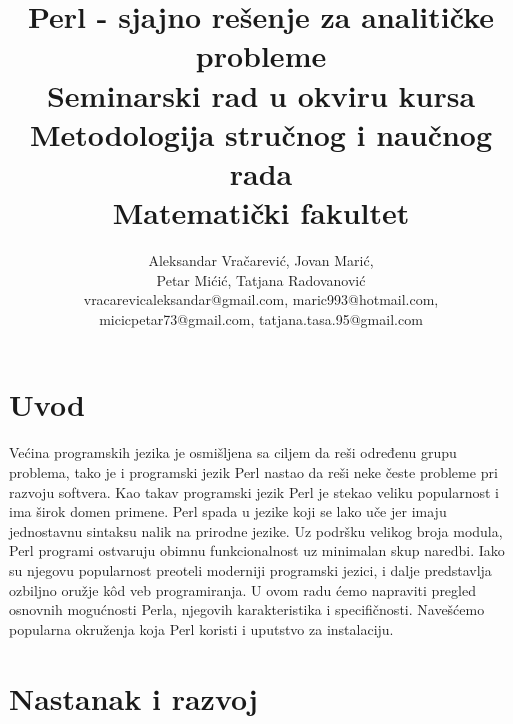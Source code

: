 \documentclass[a4paper]{article}
\begin{document}
\title{Perl - sjajno re\v senje za analiti\v cke probleme\\ \small{Seminarski rad u okviru kursa\\Metodologija stručnog i naučnog rada\\ Matematički fakultet}}

\author{Aleksandar Vračarević, Jovan Marić,\\ Petar Mićić, Tatjana Radovanović\\ vracarevicaleksandar@gmail.com, maric993@hotmail.com,\\ micicpetar73@gmail.com, tatjana.tasa.95@gmail.com}


\maketitle

\setcounter{tocdepth}{1}
\tableofcontents

\newpage

\section{Uvod}
\label{sec:uvod}

Ve\'cina programskih jezika je osmi\v sljena sa ciljem da reši određenu grupu problema, tako je i programski jezik Perl nastao da reši neke česte probleme pri razvoju softvera. Kao takav programski jezik Perl je stekao veliku popularnost i ima širok domen primene. Perl spada u jezike koji se lako uče jer imaju jednostavnu sintaksu nalik na prirodne jezike. Uz podršku velikog broja modula, Perl programi ostvaruju obimnu funkcionalnost uz minimalan skup naredbi. Iako su njegovu popularnost
preoteli moderniji programski jezici, i dalje predstavlja ozbiljno oružje k\^{o}d veb programiranja.
U ovom radu \'cemo napraviti pregled osnovnih mogućnosti Perla, njegovih karakteristika i specifičnosti. Navešćemo popularna okruženja koja Perl koristi i uputstvo za instalaciju.




\section{Nastanak i razvoj}
\end{document}
